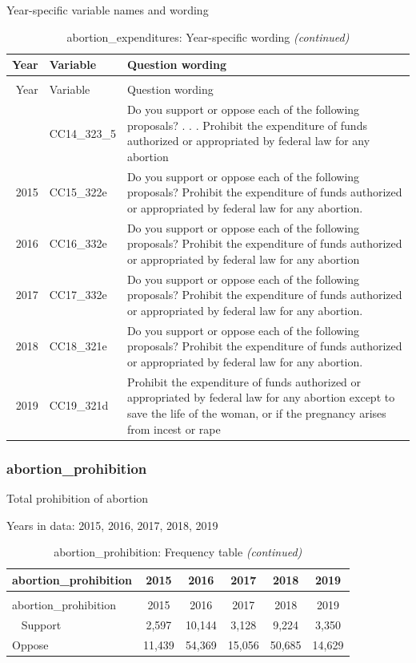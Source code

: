 \documentclass[12pt]{article}
\begin{document}
Year-specific variable names and wording

\begin{longtable}[t]{rl>{\raggedright\arraybackslash}p{10cm}}
\caption{\label{tab:unnamed-chunk-4}abortion\_expenditures: Year-specific wording}\\
\toprule
Year & Variable & Question wording\\
\midrule
\endfirsthead
\caption[]{abortion\_expenditures: Year-specific wording \textit{(continued)}}\\
\toprule
Year & Variable & Question wording\\
\midrule
\endhead
\
\endfoot
\bottomrule
\endlastfoot
2014 & CC14\_323\_5 & Do you support or oppose each of the following proposals? . . . Prohibit the expenditure of funds authorized or appropriated by federal law for any abortion\\
2015 & CC15\_322e & Do you support or oppose each of the following proposals? Prohibit the expenditure of funds authorized or appropriated by federal law for any abortion.\\
2016 & CC16\_332e & Do you support or oppose each of the following proposals? Prohibit the expenditure of funds authorized or appropriated by federal law for any abortion\\
2017 & CC17\_332e & Do you support or oppose each of the following proposals? Prohibit the expenditure of funds authorized or appropriated by federal law for any abortion.\\
2018 & CC18\_321e & Do you support or oppose each of the following proposals? Prohibit the expenditure of funds authorized or appropriated by federal law for any abortion.\\
2019 & CC19\_321d & Prohibit the expenditure of funds authorized or appropriated by federal law for any abortion except to save the life of the woman, or if the pregnancy arises from incest or rape\\*
\end{longtable}

\subsubsection{abortion\_prohibition}\label{abortion_prohibition}

Total prohibition of abortion

Years in data: 2015, 2016, 2017, 2018, 2019

\begin{longtable}[t]{lccccc}
\caption{\label{tab:unnamed-chunk-4}abortion\_prohibition: Frequency table}\\
\toprule
abortion\_prohibition & 2015 & 2016 & 2017 & 2018 & 2019\\
\midrule
\endfirsthead
\caption[]{abortion\_prohibition: Frequency table \textit{(continued)}}\\
\toprule
abortion\_prohibition & 2015 & 2016 & 2017 & 2018 & 2019\\
\midrule
\endhead
\
\endfoot
\bottomrule
\endlastfoot
Support & 2,597 & 10,144 & 3,128 & 9,224 & 3,350\\
Oppose & 11,439 & 54,369 & 15,056 & 50,685 & 14,629\\*
\end{longtable}
\end{document}
